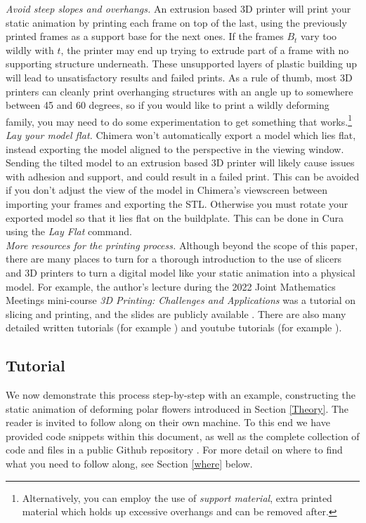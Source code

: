 \documentclass[12 pt]{article}
\begin{document}
\textit{Avoid steep slopes and overhangs.}  An extrusion based 3D printer will print your static animation by printing each frame on top of the last, using the previously printed frames as a support base for the next ones.  If the frames $B_t$ vary too wildly with $t$, the printer may end up trying to extrude part of a frame with no supporting structure underneath.  These unsupported layers of plastic building up will lead to unsatisfactory results and failed prints.  As a rule of thumb, most 3D printers can cleanly print overhanging structures with an angle up to somewhere between 45 and 60 degrees, so if you would like to print a wildly deforming family, you may need to do some experimentation to get something that works.\footnote{Alternatively, you can employ the use of \textit{support material}, extra printed material which holds up excessive overhangs and can be removed after.}\\

\textit{Lay your model flat.}  Chimera won't automatically export a model which lies flat, instead exporting the model aligned to the perspective in the viewing window.  Sending the tilted model to an extrusion based 3D printer will likely cause issues with adhesion and support, and could result in a failed print.  This can be avoided if you don't adjust the view of the model in Chimera's viewscreen between importing your frames and exporting the STL.  Otherwise you must rotate your exported model so that it lies flat on the buildplate.  This can be done in Cura using the \textit{Lay Flat} command.\\

\textit{More resources for the printing process.}  Although beyond the scope of this paper, there are many places to turn for a thorough introduction to the use of slicers and 3D printers to turn a digital model like your static animation into a physical model.  For example, the author's lecture during the 2022 Joint Mathematics Meetings mini-course \textit{3D Printing: Challenges and Applications} was a tutorial on slicing and printing, and the slides are publicly available \cite{mySlides}.  There are also many detailed written tutorials (for example \cite{printerlyTutorial}) and youtube tutorials (for example \cite{youtubeTutorial}).

\subsection{Tutorial}\label{tutorial}
We now demonstrate this process step-by-step with an example, constructing the static animation of deforming polar flowers introduced in Section \ref{Theory}.  The reader is invited to follow along on their own machine.  To this end we have provided code snippets within this document, as well as the complete collection of code and files in a public Github repository \cite{github}.  For more detail on where to find what you need to follow along, see Section \ref{where} below.\\
\end{document}
